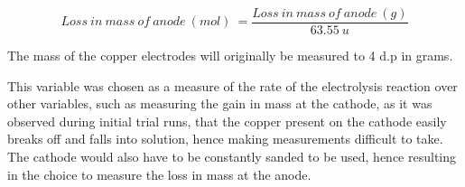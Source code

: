 \documentclass[11pt, a4]{article}
\begin{document}
			\begin{equation}
				Loss \ in \ mass \ of \ anode \ (mol) \ = \frac{Loss \ in \ mass \ of \ anode \ (g)}{63.55 \ u}
			\end{equation}
			
			The mass of the copper electrodes will originally be measured to 4 d.p in grams.
			
			\bigbreak
			
			This variable was chosen as a measure of the rate of the electrolysis reaction over other variables, such as measuring the gain in mass at the cathode, as it was observed during initial trial runs, that the copper present on the cathode easily breaks off and falls into solution, hence making measurements difficult to take. The cathode would also have to be constantly sanded to be used, hence resulting in the choice to measure the loss in mass at the anode.
			
\end{document}
